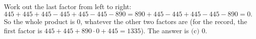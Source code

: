 Work out the last factor from left to right:
\[445+445+445-445+445-445-890=890+445-445+445-445-890=0 .\]
So the whole product is $0$, whatever the other two factors are (for the record, the first factor is $445+445+890\cdot0+445=1335$). The answer is $\boxed{\text{(c) }0}$.
